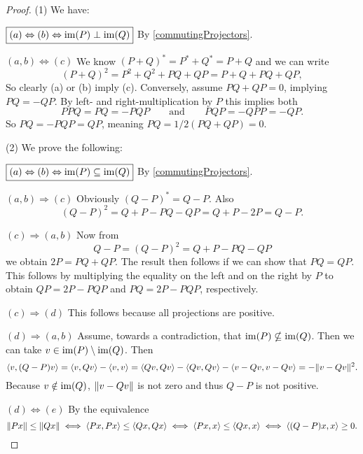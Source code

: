 \begin{proof}
(1) We have:

$\boxed{(a)\Leftrightarrow (b) \Leftrightarrow \operatorname{im}(P) \perp \operatorname{im}(Q)}$ By \ref{commutingProjectors}.

$\boxed{(a, b)\Leftrightarrow (c)}$ We know $(P+Q)^* = P^*+Q^* =P+Q$ and we can write
\[ (P+Q)^2 = P^2 + Q^2 + PQ + QP = P+Q+ PQ+QP,  \]
So clearly (a) or (b) imply (c). Conversely, assume $PQ + QP = 0$, implying $PQ=-QP$. By left- and right-multiplication by $P$ this implies both
\[ PPQ = PQ = -PQP \qquad \text{and} \qquad PQP = -QPP = -QP. \]
So $PQ = -PQP = QP$, meaning $PQ = 1/2(PQ+QP) = 0$.

(2) We prove the following:

$\boxed{(a)\Leftrightarrow (b) \Leftrightarrow \operatorname{im}(P) \subseteq \operatorname{im}(Q)}$ By \ref{commutingProjectors}.

$\boxed{(a,b)\Rightarrow (c)}$ Obviously $(Q-P)^*= Q-P$. Also
\[ (Q-P)^2 = Q+P-PQ-QP= Q+P-2P = Q-P. \]

$\boxed{(c)\Rightarrow (a,b)}$ Now from
\[ Q-P = (Q-P)^2 = Q+P-PQ-QP \]
we obtain $2P = PQ+QP$. The result then follows if we can show that $PQ=QP$. This follows by multiplying the equality on the left and on the right by $P$ to obtain $QP = 2P-PQP$ and $PQ = 2P-PQP$, respectively. 

$\boxed{(c)\Rightarrow (d)}$ This follows because all projections are positive.

$\boxed{(d)\Rightarrow (a, b)}$ Assume, towards a contradiction, that $\operatorname{im}(P)\nsubseteq \operatorname{im}(Q)$. Then we can take $v\in\operatorname{im}(P)\setminus \operatorname{im}(Q)$. Then
\[ \left\langle v,(Q-P)v \right\rangle = \left\langle v,Qv \right\rangle - \left\langle v,v \right\rangle = \left\langle Qv,Qv \right\rangle - \left\langle Qv,Qv \right\rangle - \left\langle v-Qv, v-Qv \right\rangle = -\lVert v-Qv\rVert^2. \]
Because $v\notin \operatorname{im}(Q)$, $\lVert v-Qv\rVert$ is not zero and thus $Q-P$ is not positive.

$\boxed{(d)\Leftrightarrow (e)}$ By the equivalence
\[ \lVert Px\rVert \leq \lVert Qx\rVert \iff \left\langle Px,Px \right\rangle \leq \left\langle Qx,Qx \right\rangle \iff \left\langle Px,x \right\rangle\leq \left\langle Qx,x \right\rangle \iff \left\langle (Q-P)x,x \right\rangle\geq 0. \]
\end{proof}

